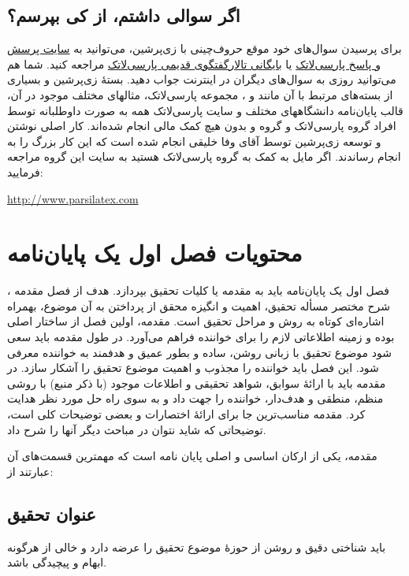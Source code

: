 \subsection{اگر سوالی داشتم، از کی بپرسم؟}
برای پرسیدن سوال‌های خود موقع حروف‌چینی با زی‌پرشین، می‌توانید به
\href{http://qa.parsilatex.com}{سایت پرسش و پاسخ پارسی‌لاتک}%
یا
\href{http://forum.parsilatex.com}{بایگانی تالارگفتگوی قدیمی پارسی‌لاتک}%
مراجعه کنید. شما هم می‌توانید روزی به سوال‌های دیگران در اینترنت جواب دهید.
بستهٔ زی‌پرشین و بسیاری از بسته‌های مرتبط با آن مانند
 و
،
مجموعه پارسی‌لاتک، مثالهای مختلف موجود در آن، قالب پایان‌نامه دانشگاههای مختلف و سایت پارسی‌لاتک همه به صورت داوطلبانه توسط افراد گروه پارسی‌لاتک و گروه
و بدون هیچ کمک مالی انجام شده‌اند. کار اصلی نوشتن و توسعه زی‌پرشین توسط آقای وفا خلیقی انجام شده است که این کار بزرگ را به انجام رساندند.
اگر مایل به کمک به گروه پارسی‌لاتک هستید به سایت این گروه مراجعه فرمایید:
\begin{center}
	\url{http://www.parsilatex.com}
\end{center}

\section{محتویات فصل اول یک پایان‌نامه}
فصل اول یک پایان‌نامه باید به مقدمه یا کلیات تحقیق بپردازد.
هدف از فصل مقدمه%
،
شرح مختصر مسأله تحقیق، اهمیت و انگیزه محقق از پرداختن به آن موضوع، بهمراه اشاره‌ای کوتاه به روش و مراحل تحقیق است. مقدمه، اولین فصل از ساختار اصلی \پ بوده و زمینه اطلاعاتی لازم را برای خواننده فراهم می‌آورد. در طول مقدمه باید سعی شود موضوع تحقیق با زبانی روشن، ساده و بطور عمیق و هدفمند به خواننده معرفی شود. این فصل باید خواننده را مجذوب و اهمیت موضوع تحقیق را آشکار سازد. در مقدمه باید با ارائهٔ سوابق، شواهد تحقیقی و اطلاعات موجود (با ذکر منبع) با روشی منظم، منطقی و هدف‌دار، خواننده را جهت داد و به سوی راه حل مورد نظر هدایت کرد. مقدمه مناسب‌ترین جا برای ارائهٔ اختصارات و بعضی توضیحات کلی است، توضیحاتی که شاید نتوان در مباحث دیگر آنها را شرح داد.

مقدمه، یکی از ارکان اساسی و اصلی پایان نامه است که مهمترین قسمت‌های آن عبارتند از: 

\subsection{عنوان تحقیق} 
باید شناختی دقیق و روشن از حوزهٔ موضوع تحقیق را عرضه دارد و خالی از هرگونه ابهام و پیچیدگی باشد.


